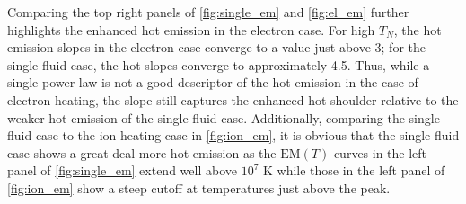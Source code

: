 \documentclass[apj]{emulateapj}
\begin{document}
	\par Comparing the top right panels of \autoref{fig:single_em} and \autoref{fig:el_em} further highlights the enhanced hot emission in the electron case. For high $T_N$, the hot emission slopes in the electron case converge to a value just above 3; for the single-fluid case, the hot slopes converge to approximately 4.5. Thus, while a single power-law is not a good descriptor of the hot emission in the case of electron heating, the slope still captures the enhanced hot shoulder relative to the weaker hot emission of the single-fluid case. Additionally, comparing the single-fluid case to the ion heating case in \autoref{fig:ion_em}, it is obvious that the single-fluid case shows a great deal more hot emission as the $\mathrm{EM}(T)$ curves in the left panel of \autoref{fig:single_em} extend well above $10^7$ K while those in the left panel of \autoref{fig:ion_em} show a steep cutoff at temperatures just above the peak.
\end{document}

